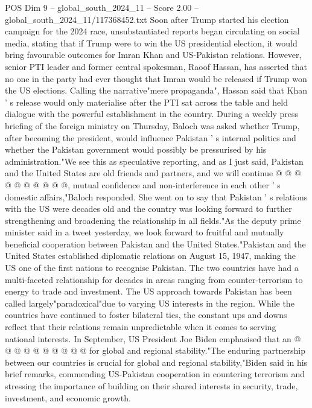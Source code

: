 \begin{textsample}{POS Dim 9 – global\_south\_2024\_11 – Score 2.00 – global\_south\_2024\_11/117368452.txt}  \label{ex:f9_pos_030}
Soon after Trump started his election campaign for the 2024 race, unsubstantiated reports began circulating on social media, stating that if Trump were to win the US presidential election, it would bring favourable outcomes for Imran Khan and US-Pakistan relations.
However, senior PTI leader and former central spokesman, Raoof Hassan, has asserted that no one in the party had ever thought that Imran would be released if Trump won the US elections.
Calling the narrative"mere propaganda", Hassan said that Khan ' s release would only materialise after the PTI sat across the table and held dialogue with the powerful establishment in the country.
During a weekly press briefing of the foreign ministry on Thursday, Baloch was asked whether Trump, after becoming the president, would influence Pakistan ' s internal politics and whether the Pakistan government would possibly be pressurised by his administration."We see this as speculative reporting, and as I just said, Pakistan and the United States are old friends and partners, and we will continue @ @ @ @ @ @ @ @ @ @, mutual confidence and non-interference in each other ' s domestic affairs,"Baloch responded.
She went on to say that Pakistan ' s relations with the US were decades old and the country was looking forward to further strengthening and broadening the relationship in all fields."As the deputy prime minister said in a tweet yesterday, we look forward to fruitful and mutually beneficial cooperation between Pakistan and the United States."Pakistan and the United States established diplomatic relations on August 15, 1947, making the US one of the first nations to recognise Pakistan.
The two countries have had a multi-faceted relationship for decades in areas ranging from counter-terrorism to energy to trade and investment.
The US approach towards Pakistan has been called largely"paradoxical"due to varying US interests in the region.
While the countries have continued to foster bilateral ties, the constant ups and downs reflect that their relations remain unpredictable when it comes to serving national interests.
In September, US President Joe Biden emphasised that an @ @ @ @ @ @ @ @ @ @ for global and regional stability."The enduring partnership between our countries is crucial for global and regional stability,"Biden said in his brief remarks, commending US-Pakistan cooperation in countering terrorism and stressing the importance of building on their shared interests in security, trade, investment, and economic growth.

\end{textsample}
